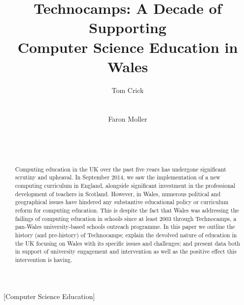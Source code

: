 \documentclass{sig-alternate}
\begin{document}
%

\title{Technocamps: A Decade of Supporting\\Computer Science Education in Wales}

\author{
\alignauthor
Tom Crick\\
\\
\\
\alignauthor
Faron Moller\\
\\
\\
\\
}

\maketitle

\begin{abstract}
Computing education in the UK over the past five years has undergone
significant scrutiny and upheaval. In September 2014, we saw the
implementation of a new computing curriculum in England, alongside
significant investment in the professional development of teachers in
Scotland. However, in Wales, numerous political and geographical
issues have hindered any substantive educational policy or curriculum
reform for computing education. This is despite the fact that Wales
was addressing the failings of computing education in schools since at
least 2003 through Technocamps, a pan-Wales university-based schools
outreach programme. In this paper we outline the history (and
pre-history) of Technocamps; explain the devolved nature of education
in the UK focusing on Wales with its specific issues and challenges;
and present data both in support of university engagement and
intervention as well as the positive effect this intervention is
having.
\end{abstract}

[Computer Science Education]
\end{document}
